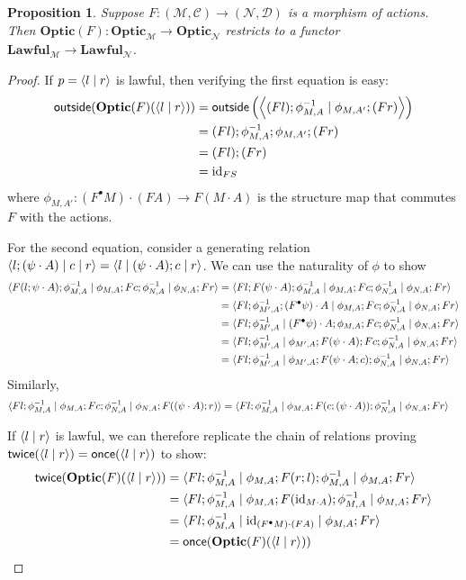 \documentclass[11pt,letterpaper]{article}
\theoremstyle{plain}
\newtheorem{proposition}[theorem]{Proposition}
\theoremstyle{definition}
\newcommand{\C}{\mathscr{C}}
\newcommand{\D}{\mathscr{D}}
\newcommand{\M}{\mathscr{M}}
\newcommand{\N}{\mathscr{N}}
\newcommand{\Optic}{\mathbf{Optic}}
\newcommand{\Lawful}{\mathbf{Lawful}}
\newcommand{\id}{\mathrm{id}}
\newcommand{\act}{\cdot}
\newcommand{\rep}[2]{{\ensuremath \left\langle #1 \mid #2 \right\rangle}}
\newcommand{\repthree}[3]{{\ensuremath \langle #1 \mid #2 \mid #3 \rangle}}
\newcommand{\outside}{\mathsf{outside}}
\newcommand{\once}{\mathsf{once}}
\newcommand{\twice}{\mathsf{twice}}
\begin{document}
\begin{proposition}
  Suppose $F : (\M, \C) \to (\N, \D)$ is a morphism of actions. Then $\Optic(F) : \Optic_\M \to \Optic_\N$ restricts to a functor $\Lawful_\M \to \Lawful_\N$.
\end{proposition}
\begin{proof}
  If $p = \rep{l}{r}$ is lawful, then verifying the first equation is easy:
  \begin{align*}
  \outside(\Optic(F)(\rep{l}{r}))
  &= \outside\left(\rep{(Fl);\phi^{-1}_{M,A}}{\phi_{M,A'};(Fr)}\right) \\
  &= (Fl);\phi^{-1}_{M,A};\phi_{M,A'};(Fr)\\
  &= (Fl);(Fr)\\
  &= \id_{FS}
  \end{align*}
  where $\phi_{M,A'} : (F^\bullet M) \act (FA) \to F(M \act A)$ is the structure map that commutes $F$ with the actions.

  For the second equation, consider a generating relation $\repthree{l;(\psi \act A)}{c}{r} = \repthree{l}{(\psi \act A) ; c}{r}$. We can use the naturality of $\phi$ to show
  \begin{align*}
  \repthree{F(l;\psi \act A);\phi^{-1}_{M,A}}{\phi_{M,A};Fc;\phi^{-1}_{N,A}}{\phi_{N,A};Fr}
  &= \repthree{Fl;F(\psi \act A);\phi^{-1}_{M,A}}{\phi_{M,A};Fc;\phi^{-1}_{N,A}}{\phi_{N,A};Fr} \\
  &= \repthree{Fl;\phi^{-1}_{M',A};(F^\bullet \psi) \act A}{\phi_{M,A};Fc;\phi^{-1}_{N,A}}{\phi_{N,A};Fr} \\
  &= \repthree{Fl;\phi^{-1}_{M',A}}{(F^\bullet \psi) \act A;\phi_{M,A};Fc;\phi^{-1}_{N,A}}{\phi_{N,A};Fr} \\
  &= \repthree{Fl;\phi^{-1}_{M',A}}{\phi_{M',A};F(\psi \act A);Fc;\phi^{-1}_{N,A}}{\phi_{N,A};Fr} \\
  &= \repthree{Fl;\phi^{-1}_{M',A}}{\phi_{M',A};F(\psi \act A;c);\phi^{-1}_{N,A}}{\phi_{N,A};Fr}
  \end{align*}
  Similarly,
  \begin{align*}
    \repthree{Fl;\phi^{-1}_{M,A}}{\phi_{M,A};Fc;\phi^{-1}_{N,A}}{\phi_{N,A};F((\psi \act A);r)}
    &= \repthree{Fl;\phi^{-1}_{M,A}}{\phi_{M,A};F(c;(\psi \act A));\phi^{-1}_{N,A}}{\phi_{N,A};Fr}
  \end{align*}

  If $\rep{l}{r}$ is lawful, we can therefore replicate the chain of relations proving $\twice(\rep{l}{r}) = \once(\rep{l}{r})$ to show:
  \begin{align*}
  \twice(\Optic(F)(\rep{l}{r}))
  &= \repthree{Fl;\phi^{-1}_{M,A}}{\phi_{M,A};F(r;l);\phi^{-1}_{M,A}}{\phi_{M,A};Fr}  \\
  &= \repthree{Fl;\phi^{-1}_{M,A}}{\phi_{M,A};F(\id_{M \act A});\phi^{-1}_{M,A}}{\phi_{M,A};Fr}  \\
  &= \repthree{Fl;\phi^{-1}_{M,A}}{\id_{(F^\bullet M) \act (FA)}}{\phi_{M,A};Fr}  \\
  &= \once(\Optic(F)(\rep{l}{r}))
  \end{align*}
\end{proof}
\end{document}
